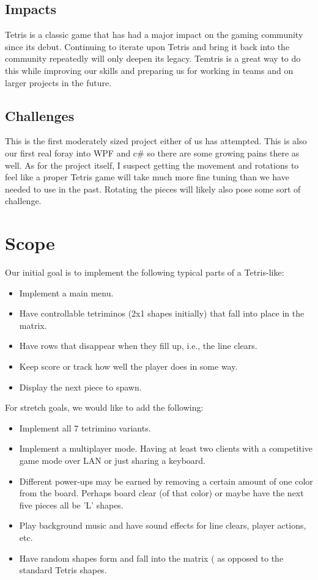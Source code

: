 \documentclass[10pt,conference,onecolumn,compsoc]{IEEEtran}
\begin{document}
\subsection{Impacts}
Tetris is a classic game that has had a major impact on the gaming community since its debut. Continuing to iterate upon Tetris and bring it back into the community repeatedly will only deepen its legacy. Temtris is a great way to  do this while improving our skills and preparing us for working in teams and on larger projects in the future.

\subsection{Challenges}
This is the first moderately sized project either of us has attempted. This is also our first real foray into WPF and c\# so there are some growing pains there as well. As for the project itself, I suspect getting the movement and rotations to feel like a proper Tetris game will take much more fine tuning than we have needed to use in the past. Rotating the pieces will likely also pose some sort of challenge.

\section{Scope}
Our initial goal is to implement the following typical parts of a Tetris-like: 
\begin{itemize}
\item Implement a main menu.
\item Have controllable tetriminos (2x1 shapes initially) that fall into place in the matrix. 
\item Have rows that disappear when they fill up, i.e., the line clears.
\item Keep score or track how well the player does in some way.
\item Display the next piece to spawn.
\end{itemize}

For stretch goals, we would like to add the following:
\begin{itemize}
\item Implement all 7 tetrimino variants.
\item Implement a multiplayer mode. Having at least two clients with a competitive game mode over LAN or just sharing a keyboard.
\item Different power-ups may be earned by removing a certain amount of one color from the board. Perhaps board clear (of that color) or maybe have the next five pieces all be 'L' shapes.
\item Play background music and have sound effects for line clears, player actions, etc.
\item Have random shapes form and fall into the matrix ( as opposed to the standard Tetris shapes.
\end{itemize}
\end{document}
